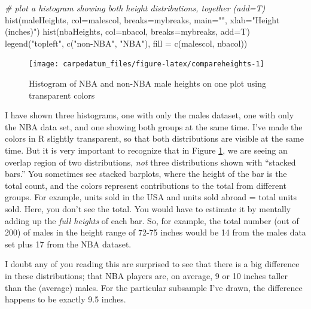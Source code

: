 \documentclass[
  openany]{book}
\newenvironment{Shaded}{\begin{snugshade}}{\end{snugshade}}
\newcommand{\AttributeTok}[1]{\textcolor[rgb]{0.77,0.63,0.00}{#1}}
\newcommand{\CommentTok}[1]{\textcolor[rgb]{0.56,0.35,0.01}{\textit{#1}}}
\newcommand{\FunctionTok}[1]{\textcolor[rgb]{0.00,0.00,0.00}{#1}}
\newcommand{\NormalTok}[1]{#1}
\newcommand{\StringTok}[1]{\textcolor[rgb]{0.31,0.60,0.02}{#1}}
\begin{document}
\begin{Shaded}
\begin{Highlighting}[]
\CommentTok{\# plot a histogram showing both height distributions, together (add=T)}
\FunctionTok{hist}\NormalTok{(maleHeights, }\AttributeTok{col=}\NormalTok{malescol, }\AttributeTok{breaks=}\NormalTok{mybreaks, }
          \AttributeTok{main=}\StringTok{""}\NormalTok{, }\AttributeTok{xlab=}\StringTok{"Height (inches)"}\NormalTok{)}
\FunctionTok{hist}\NormalTok{(nbaHeights, }\AttributeTok{col=}\NormalTok{nbacol, }\AttributeTok{breaks=}\NormalTok{mybreaks, }\AttributeTok{add=}\NormalTok{T)}
\FunctionTok{legend}\NormalTok{(}\StringTok{"topleft"}\NormalTok{, }\FunctionTok{c}\NormalTok{(}\StringTok{"non{-}NBA"}\NormalTok{, }\StringTok{"NBA"}\NormalTok{), }\AttributeTok{fill =} \FunctionTok{c}\NormalTok{(malescol, nbacol))}
\end{Highlighting}
\end{Shaded}

\begin{figure}

{\centering \texttt{[image: carpedatum\_files/figure-latex/compareheights-1]} 

}

\caption{Histogram of NBA and non-NBA male heights on one plot using transparent colors}\label{fig:compareheights}
\end{figure}

I have shown three histograms, one with only the males dataset, one with only the NBA data set, and one showing both groups at the same time. I've made the colors in R slightly transparent, so that both distributions are visible at the same time. But it is very important to recognize that in Figure \ref{fig:compareheights}, we are seeing an overlap region of two distributions, \emph{not} three distributions shown with ``stacked bars.'' You sometimes see stacked barplots, where the height of the bar is the total count, and the colors represent contributions to the total from different groups. For example, units sold in the USA and units sold abroad = total units sold. Here, you don't see the total. You would have to estimate it by mentally adding up the \emph{full heights} of each bar. So, for example, the total number (out of 200) of males in the height range of 72-75 inches would be 14 from the males data set plus 17 from the NBA dataset.

I doubt any of you reading this are surprised to see that there is a big difference in these distributions; that NBA players are, on average, 9 or 10 inches taller than the (average) males. For the particular subsample I've drawn, the difference happens to be exactly 9.5 inches.
\end{document}

